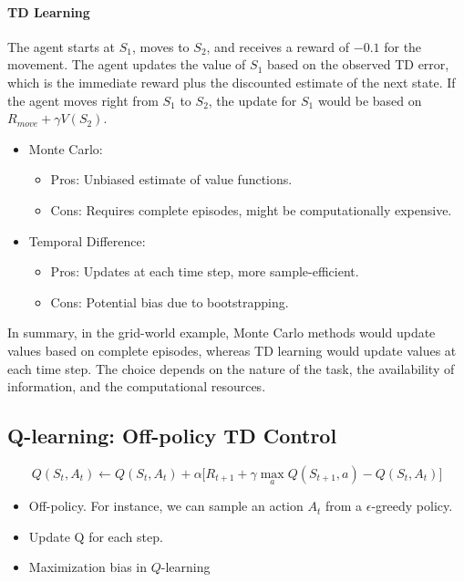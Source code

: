 \paragraph{TD Learning} The agent starts at $S_1$, moves to $S_2$, and receives a reward of $−0.1$ for the movement. The agent updates the value of $S_1$ based on the observed TD error, which is the immediate reward plus the discounted estimate of the next state. If the agent moves right from $S_1$ to $S_2$, the update for $S_1$ would be based on $R_{move}+\gamma V(S_2)$.

\begin{itemize}
	\item Monte Carlo:
		\begin{itemize}
			\item Pros: Unbiased estimate of value functions.
			\item Cons: Requires complete episodes, might be computationally expensive.
		\end{itemize}
	\item Temporal Difference:
		\begin{itemize}
			\item Pros: Updates at each time step, more sample-efficient.
			\item Cons: Potential bias due to bootstrapping.
		\end{itemize}
\end{itemize}
In summary, in the grid-world example, Monte Carlo methods would update values based on complete episodes, whereas TD learning would update values at each time step. The choice depends on the nature of the task, the availability of information, and the computational resources.

\subsection{Q-learning: Off-policy TD Control}

$$Q(S_t, A_t) \leftarrow Q(S_t, A_t)+ \alpha \Big[R_{t+1}+\gamma \max_a Q(S_{t+1}, a)-Q(S_t, A_t)\Big] $$

\begin{itemize}
	\item Off-policy. For instance, we can sample an action $A_t$ from a $\epsilon$-greedy policy. 
	\item Update Q for each step.
	\item Maximization bias in $Q$-learning
\end{itemize}

